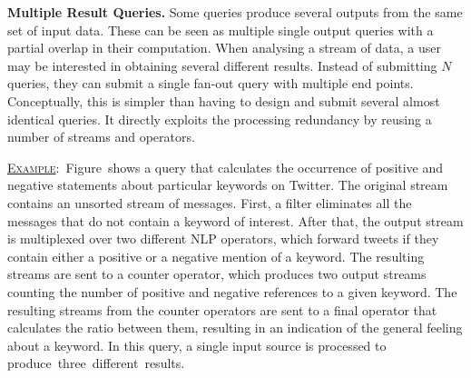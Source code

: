 \textbf{Multiple Result Queries.} Some queries produce several outputs from the same set of
input data.
These can be seen as multiple single output queries with a partial overlap in their computation. When analysing a
stream of data, a user may be interested in obtaining several different results. Instead of submitting
$N$ queries, they can submit a single fan-out query with multiple end points. Conceptually, this is
simpler than having to design and submit several almost identical queries. It directly exploits the
processing redundancy by reusing a number of streams and operators.


\underline{\textsc{Example}}:~Figure~\DIFdelbegin \DIFdel{\ref{fig:query_fanout} }\DIFdelend \DIFaddbegin \DIFadd{\ref{fig:query_fanouts3} }\DIFaddend shows a query that calculates the occurrence
of positive and negative statements about particular keywords on Twitter. 
The original stream contains an unsorted stream of messages. First, a filter eliminates all the
messages that do not contain a keyword of interest. After that, the output stream is multiplexed over
two different NLP operators, which forward tweets if they contain
either a positive or a negative mention of a keyword. The resulting streams are sent to a counter
operator, which produces two output streams counting the number of positive and negative references to
a given keyword. The resulting streams from the counter operators are sent to a final operator that
calculates the ratio between them, resulting in an indication of the general feeling about a
keyword. In this query, a single input source is processed to produce~three~different~results.


